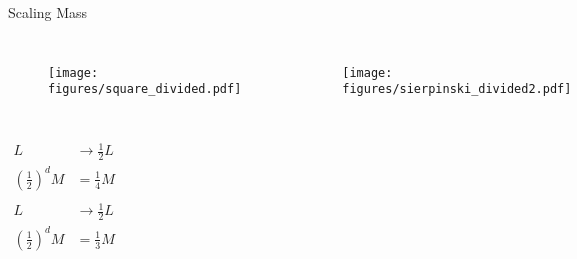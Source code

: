 \documentclass[10pt]{beamer}
\begin{document}
\begin{frame}{Scaling Mass}
    \begin{columns}[c]
        \column{1.5in}
        \begin{figure}[h!]
            \centering
            \texttt{[image: figures/square\_divided.pdf]}
        \end{figure}
    \column{1.5in}
        \begin{figure}[h!]
            \centering
            \texttt{[image: figures/sierpinski\_divided2.pdf]}
        \end{figure}
    \end{columns}
    \begin{columns}[c]
        \column{1.5in}
            \begin{align*}
                L &\rightarrow \frac{1}{2} L \\
                \left (\frac{1}{2} \right )^d M &= \frac{1}{4} M \\
            \end{align*}
        \column{1.5in}
            \begin{align*}
                L &\rightarrow \frac{1}{2} L \\
                \left (\frac{1}{2} \right )^d M &= \frac{1}{3} M \\
            \end{align*}
    \end{columns}
\end{frame}
\end{document}

